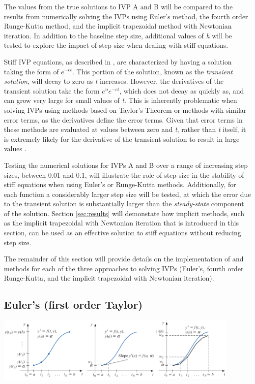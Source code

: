 \documentclass{article}
\begin{document}
The values from the true solutions to IVP A and B will be compared to the results from numerically solving the IVPs using Euler's method, the fourth order Runge-Kutta method, and the implicit trapezoidal method with Newtonian iteration. In addition to the baseline step size, additional values of \textit{h} will be tested to explore the impact of step size when dealing with stiff equations. 

Stiff IVP equations, as described in \cite{burden2010}, are characterized by having a solution taking the form of $e^{-ct}$. This portion of the solution, known as the \textit{transient solution}, will decay to zero as \textit{t} increases. However, the derivatives of the transient solution take the form $e^{n}e^{-ct}$, which does not decay as quickly as, and can grow very large for small values of \textit{t}. This is inherently problematic when solving IVPs using methods based on Taylor's Theorem or methods with similar error terms, as the derivatives define the error terms. Given that error terms in these methods are evaluated at values between zero and \textit{t}, rather than \textit{t} itself, it is extremely likely for the derivative of the transient solution to result in large values \citep{burden2010}. 

Testing the numerical solutions for IVPs A and B over a range of increasing step sizes, between 0.01 and 0.1, will illustrate the role of step size in the stability of stiff equations when using Euler's or Runge-Kutta methods. Additionally, for each function a considerably larger step size will be tested, at which the error due to the transient solution is substantially larger than the \textit{steady-state} component of the solution. Section \ref{sec:results} will demonstate how implicit methods, such as the implicit trapezoidal with Newtonian iteration that is introduced in this section, can be used as an effective solution to stiff equations without reducing step size.

The remainder of this section will provide details on the implementation of and methods for each of the three approaches to solving IVPs (Euler's, fourth order Runge-Kutta, and the implicit trapezoidal with Newtonian iteration).


\subsection{Euler's (first order Taylor)}
\label{method:euler}

\begin{center}
  \includegraphics[width=0.9\textwidth]{../additional/euler_method.png}
  \label{fig:euler_method}
\end{center}
\end{document}
